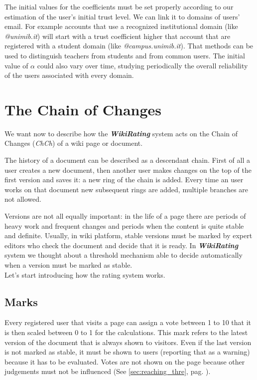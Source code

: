 \documentclass[a4paper,11pt]{article}
\newcommand{\wir}{\textbf{\textit{WikiRating }}}
\newcommand{\al}{$\alpha$ }
\begin{document}
The initial values for the coefficients must be set properly according to our estimation 
of the user's initial trust level. We can link it to domains of users' email. For example 
accounts that use a recognized institutional domain (like \textit{@unimib.it}) will start 
with a trust coefficient higher that account that are registered with a student domain 
(like \textit{@campus.unimib.it}). That methods can be used to distinguish teachers from 
students and from common users. The initial value of \al could also vary over time, 
studying periodically the overall reliability of the users associated with every domain.

\newpage
\section{The Chain of Changes}\label{sec:chch}
We want now to describe how the \wir system acts on the Chain of Changes (\textit{ChCh}) 
of a wiki page or document.

The history of a document can be described as a descendant chain. First of all a user 
creates a new document, then another user makes changes on the top of the first version and saves it: a new ring of the chain is added. Every time an user works on that document  
new subsequent rings are added, multiple branches are not allowed.

Versions are not all equally important: in the life of a page there are periods of heavy 
work and frequent changes and periods when the content is quite stable and definite. 
Usually, in wiki platform, stable versions must be marked by expert editors who check the 
document and decide that it is ready. In \wir system we thought about a threshold 
mechanism able to decide automatically when a version must be marked as stable.\\

Let's start introducing how the rating system works.

\subsection{Marks} \label{sec:marks}
Every registered user that visits a page can assign a vote between 1 to 10 
that it is then scaled between 0 to 1 for the calculations. This mark refers to the latest 
version of the document that is  always shown to visitors. Even if the last version is not 
marked as stable, it must be shown to users (reporting that as a warning) because it has 
to be evaluated. Votes are not shown on the page because other judgements must not be 
influenced (See \ref{sec:reaching_thre}, pag. \pageref{sec:reaching_thre}).
\end{document}
